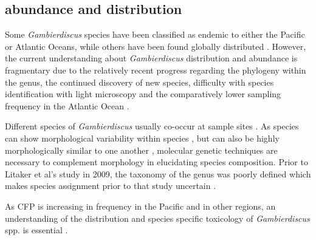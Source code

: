 \documentclass[12pt]{article}
\begin{document}
\subsection{abundance and distribution}
Some \emph{Gambierdiscus} species have been classified as endemic to either the Pacific or Atlantic Oceans, while others have been found globally distributed \cite{berdalet2012global,litaker2010global}. %
However, the current understanding about \emph{Gambierdiscus} distribution and abundance is fragmentary due to the relatively recent progress regarding the phylogeny within the genus, the continued discovery of new species, difficulty with species identification with light microscopy and the comparatively lower sampling frequency in the Atlantic Ocean \cite{berdalet2012global,nishimura2014morphology}. 

Different species of \emph{Gambierdiscus} usually co-occur at sample sites \cite{litaker2010global}. As species can show morphological variability within species \cite{bravo2014cellular}, but can also be highly morphologically similar to one another \cite{kohli2014high}, molecular genetic techniques are necessary to complement morphology in elucidating species composition. Prior to Litaker et al's study in 2009, the taxonomy of the genus was poorly defined which makes species assignment prior to that study uncertain \cite{berdalet2012global}. %

 As CFP is increasing in frequency in the Pacific \cite{skinner2011ciguatera} and in other regions, an understanding of the distribution and species specific toxicology of \emph{Gambierdiscus} spp. is essential \cite{globalcig}.
 
\end{document}
